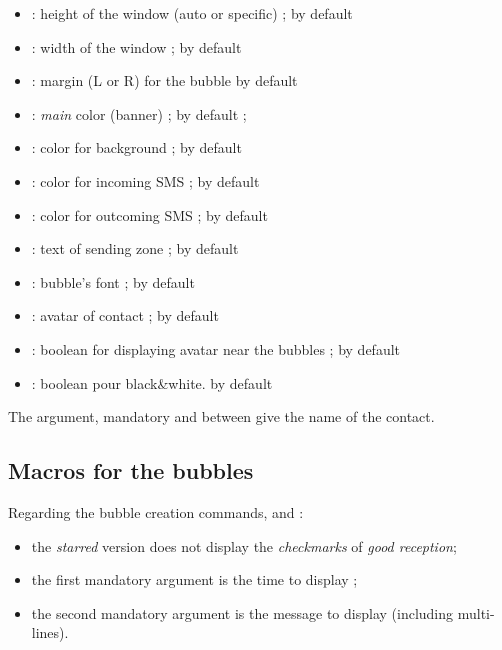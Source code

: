 \documentclass[english,11pt,a4paper]{article}
\begin{document}
\begin{itemize}
	\item {} : height of the window (auto or specific) ;  by default
	\item {} : width of the window ; \MontreCode{7cm} by default
	\item {} : margin (L or R) for the bubble \MontreCode{1.5cm} by default
	\item {} : \textit{main} color (banner) ;  by default ;
	\item {} : color for background ;  by default
	\item {} : color for incoming SMS ;  by default
	\item {} : color for outcoming SMS ;  by default
	\item {} : text of sending zone ;  by default
	\item {} : bubble's font ;  by default
	\item {} : avatar of contact ;  by default
	\item {} : boolean for displaying avatar near the bubbles ;  by default
	\item {} : boolean pour black\&white.  by default
\end{itemize}

The argument, mandatory and between  give the name of the contact.

\subsection{Macros for the bubbles}

Regarding the bubble creation commands,  and :

\begin{itemize}
	\item the \textit{starred} version does not display the \textit{checkmarks} of \textit{good reception};
	\item the first mandatory argument is the time to display ;
	\item the second mandatory argument is the message to display (including multi-lines).
\end{itemize}
\end{document}
